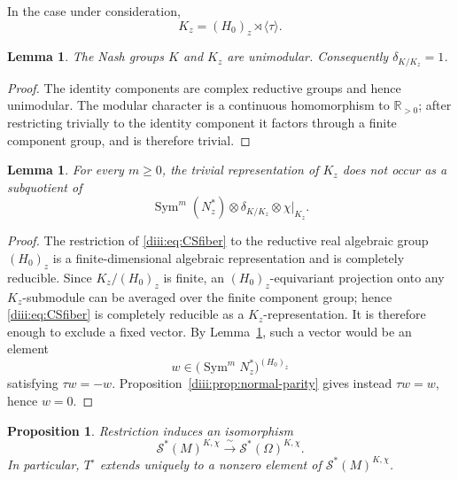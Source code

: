 \documentclass[11pt,reqno]{amsart}
\numberwithin{equation}{section}
\newtheorem{proposition}[theorem]{Proposition}
\newtheorem{lemma}[theorem]{Lemma}
\theoremstyle{definition}
\theoremstyle{remark}
\newcommand{\Sym}{\operatorname{Sym}}
\newcommand{\cS}{\mathcal S}
\begin{document}
In the case under consideration,
\[
  K_z=(H_0)_z\rtimes\langle\tau\rangle.
\]

\begin{lemma}\label{diii:lem:modular}
The Nash groups $K$ and $K_z$ are unimodular.  Consequently
$\delta_{K/K_z}=1$.
\end{lemma}

\begin{proof}
The identity components are complex reductive groups and hence unimodular.  The modular character is a continuous homomorphism to $\mathbb R_{>0}$; after restricting trivially to the identity component it factors through a finite component group, and is therefore trivial.
\end{proof}

\begin{lemma}\label{diii:lem:CScondition}
For every $m\ge0$, the trivial representation of $K_z$ does not occur as a subquotient of
\begin{equation}\label{diii:eq:CSfiber}
  \Sym^m(N_z^*)\otimes\delta_{K/K_z}\otimes\chi|_{K_z}.
\end{equation}
\end{lemma}

\begin{proof}
The restriction of \eqref{diii:eq:CSfiber} to the reductive real algebraic group
$(H_0)_z$ is a finite-dimensional algebraic representation and is completely reducible.  Since $K_z/(H_0)_z$ is finite, an $(H_0)_z$-equivariant projection onto any $K_z$-submodule can be averaged over the finite component group; hence \eqref{diii:eq:CSfiber} is completely reducible as a $K_z$-representation.  It is therefore enough to exclude a fixed vector.  By Lemma~\ref{diii:lem:modular}, such a vector would be an element
\[
  w\in\bigl(\Sym^mN_z^*\bigr)^{(H_0)_z}
\]
satisfying $\tau w=-w$.  Proposition~\ref{diii:prop:normal-parity} gives instead
$\tau w=w$, hence $w=0$.
\end{proof}

\begin{proposition}\label{diii:prop:automatic-extension}
Restriction induces an isomorphism
\begin{equation}\label{diii:eq:restriction-iso}
  \cS^*(M)^{K,\chi}
  \xrightarrow{\ \sim\ }
  \cS^*(\Omega)^{K,\chi}.
\end{equation}
In particular, $T^\circ$ extends uniquely to a nonzero element of
$\cS^*(M)^{K,\chi}$.
\end{proposition}
\end{document}
